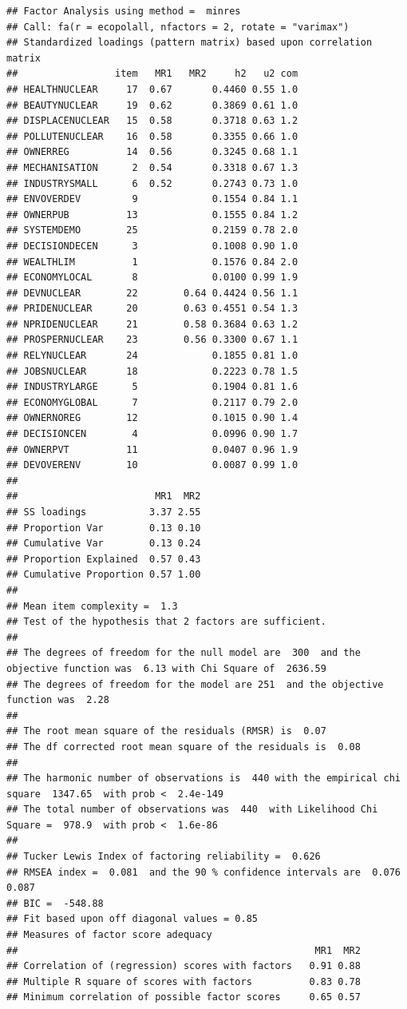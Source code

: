 \documentclass[
]{article}
\begin{document}
\begin{verbatim}
## Factor Analysis using method =  minres
## Call: fa(r = ecopolall, nfactors = 2, rotate = "varimax")
## Standardized loadings (pattern matrix) based upon correlation matrix
##                 item   MR1   MR2     h2   u2 com
## HEALTHNUCLEAR     17  0.67       0.4460 0.55 1.0
## BEAUTYNUCLEAR     19  0.62       0.3869 0.61 1.0
## DISPLACENUCLEAR   15  0.58       0.3718 0.63 1.2
## POLLUTENUCLEAR    16  0.58       0.3355 0.66 1.0
## OWNERREG          14  0.56       0.3245 0.68 1.1
## MECHANISATION      2  0.54       0.3318 0.67 1.3
## INDUSTRYSMALL      6  0.52       0.2743 0.73 1.0
## ENVOVERDEV         9             0.1554 0.84 1.1
## OWNERPUB          13             0.1555 0.84 1.2
## SYSTEMDEMO        25             0.2159 0.78 2.0
## DECISIONDECEN      3             0.1008 0.90 1.0
## WEALTHLIM          1             0.1576 0.84 2.0
## ECONOMYLOCAL       8             0.0100 0.99 1.9
## DEVNUCLEAR        22        0.64 0.4424 0.56 1.1
## PRIDENUCLEAR      20        0.63 0.4551 0.54 1.3
## NPRIDENUCLEAR     21        0.58 0.3684 0.63 1.2
## PROSPERNUCLEAR    23        0.56 0.3300 0.67 1.1
## RELYNUCLEAR       24             0.1855 0.81 1.0
## JOBSNUCLEAR       18             0.2223 0.78 1.5
## INDUSTRYLARGE      5             0.1904 0.81 1.6
## ECONOMYGLOBAL      7             0.2117 0.79 2.0
## OWNERNOREG        12             0.1015 0.90 1.4
## DECISIONCEN        4             0.0996 0.90 1.7
## OWNERPVT          11             0.0407 0.96 1.9
## DEVOVERENV        10             0.0087 0.99 1.0
## 
##                        MR1  MR2
## SS loadings           3.37 2.55
## Proportion Var        0.13 0.10
## Cumulative Var        0.13 0.24
## Proportion Explained  0.57 0.43
## Cumulative Proportion 0.57 1.00
## 
## Mean item complexity =  1.3
## Test of the hypothesis that 2 factors are sufficient.
## 
## The degrees of freedom for the null model are  300  and the objective function was  6.13 with Chi Square of  2636.59
## The degrees of freedom for the model are 251  and the objective function was  2.28 
## 
## The root mean square of the residuals (RMSR) is  0.07 
## The df corrected root mean square of the residuals is  0.08 
## 
## The harmonic number of observations is  440 with the empirical chi square  1347.65  with prob <  2.4e-149 
## The total number of observations was  440  with Likelihood Chi Square =  978.9  with prob <  1.6e-86 
## 
## Tucker Lewis Index of factoring reliability =  0.626
## RMSEA index =  0.081  and the 90 % confidence intervals are  0.076 0.087
## BIC =  -548.88
## Fit based upon off diagonal values = 0.85
## Measures of factor score adequacy             
##                                                    MR1  MR2
## Correlation of (regression) scores with factors   0.91 0.88
## Multiple R square of scores with factors          0.83 0.78
## Minimum correlation of possible factor scores     0.65 0.57
\end{verbatim}
\end{document}

